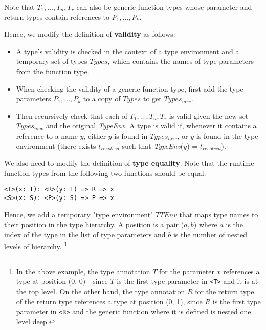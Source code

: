 Note that $T_1, \dots, T_n, T_r$ can also be generic function types whose parameter and return types contain references to $P_1, \dots, P_k$.

Hence, we modify the definition of \textbf{validity} as follows:
\begin{itemize}
    \item A type's validity is checked in the context of a type environment and a temporary set of types $Types$, which contains the names of type parameters from the function type.
    \item When checking the validity of a generic function type, first add the type parameters $P_1, \dots, P_k$ to a copy of $Types$ to get $Types_{new}$. 
    \item Then recursively check that each of $T_1, \dots, T_n, T_r$ is valid given the new set $Types_{new}$ and the original \textit{TypeEnv}. A type is valid if, whenever it contains a reference to a name $y$, either $y$ is found in $Types_{new}$, or $y$ is found in the type environment (there exists $t_{resolved}$ such that \textit{TypeEnv}($y$) = $t_{resolved}$).
\end{itemize}

We also need to modify the definition of \textbf{type equality}. Note that the runtime function types from the following two functions should be equal:

\begin{center}
    \verb|<T>(x: T): <R>(y: T) => R => x| \\
    \verb|<S>(x: S): <P>(y: S) => P => x|
\end{center}

Hence, we add a temporary "type environment" $TTEnv$ that maps type names to their position in the type hierarchy. 
A position is a pair ($a, b$) where $a$ is the index of the type in the list of type parameters and $b$ is the number of nested levels of hierarchy.
\footnote{In the above example, the type annotation $T$ for the parameter $x$ references a type at position (0, 0) - since $T$ is the first type parameter in \texttt{<T>} and it is at the top level. 
On the other hand, the type annotation $R$ for the return type of the return type references a type at position (0, 1), since $R$ is the first type parameter in \texttt{<R>} and the generic function where it is defined is nested one level deep.}

